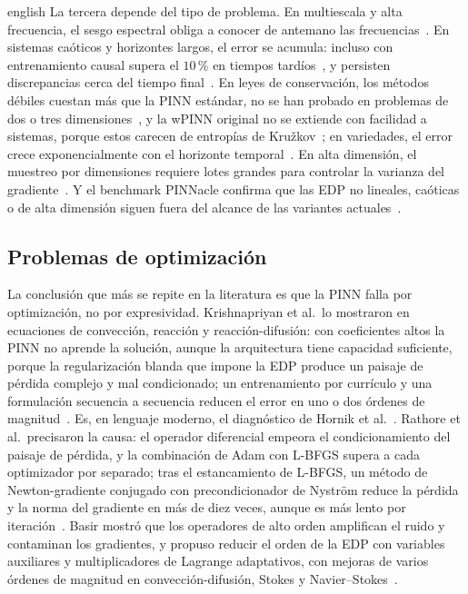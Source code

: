 \documentclass[../0000.tex]{subfiles}
\begin{document}
\begin{hyphenrules}{english}
La tercera depende del tipo de problema. En multiescala y alta frecuencia, el sesgo espectral obliga a conocer de antemano las frecuencias~\cite{wang2021eigenvector}. En sistemas caóticos y horizontes largos, el error se acumula: incluso con entrenamiento causal supera el $10$\,\% en tiempos tardíos~\cite{wang2024causality}, y persisten discrepancias cerca del tiempo final~\cite{wang2023expert}. En leyes de conservación, los métodos débiles cuestan más que la PINN estándar, no se han probado en problemas de dos o tres dimensiones~\cite{deryck2024wpinn,chaumet2024improving}, y la wPINN original no se extiende con facilidad a sistemas, porque estos carecen de entropías de Kružkov~\cite{deryck2024wpinn}; en variedades, el error crece exponencialmente con el horizonte temporal~\cite{zhou2025weak}. En alta dimensión, el muestreo por dimensiones requiere lotes grandes para controlar la varianza del gradiente~\cite{hu2024tackling}. Y el benchmark PINNacle confirma que las EDP no lineales, caóticas o de alta dimensión siguen fuera del alcance de las variantes actuales~\cite{hao2024pinnacle}.

\subsection{Problemas de optimización}
\label{subsec:ea-opt}

La conclusión que más se repite en la literatura es que la PINN falla por optimización, no por expresividad. Krishnapriyan et al.\ lo mostraron en ecuaciones de convección, reacción y reacción-difusión: con coeficientes altos la PINN no aprende la solución, aunque la arquitectura tiene capacidad suficiente, porque la regularización blanda que impone la EDP produce un paisaje de pérdida complejo y mal condicionado; un entrenamiento por currículo y una formulación secuencia a secuencia reducen el error en uno o dos órdenes de magnitud~\cite{krishnapriyan2021}. Es, en lenguaje moderno, el diagnóstico de Hornik et al.~\cite{hornik1989}. Rathore et al.\ precisaron la causa: el operador diferencial empeora el condicionamiento del paisaje de pérdida, y la combinación de Adam con L-BFGS supera a cada optimizador por separado; tras el estancamiento de L-BFGS, un método de Newton-gradiente conjugado con precondicionador de Nyström reduce la pérdida y la norma del gradiente en más de diez veces, aunque es más lento por iteración~\cite{rathore2024challenges}. Basir mostró que los operadores de alto orden amplifican el ruido y contaminan los gradientes, y propuso reducir el orden de la EDP con variables auxiliares y multiplicadores de Lagrange adaptativos, con mejoras de varios órdenes de magnitud en convección-difusión, Stokes y Navier--Stokes~\cite{basir2022investigating}.


\end{hyphenrules}
\end{document}
